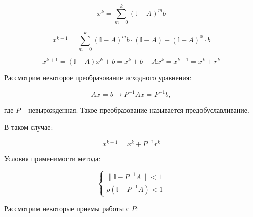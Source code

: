 \documentclass[10pt,a4paper]{article}
\begin{document}
		\begin{equation}
			x^{k} = \sum\limits_{m = 0}^{k}\left(\mathbb{I} - A\right)^{m}b	
		\end{equation}	
		
		\begin{equation}
			x^{k + 1} = \sum\limits_{m = 0}^{k}\left(\mathbb{I} - A\right)^{m}b	
			\cdot \left(\mathbb{I} - A\right) + \left(\mathbb{I} - A\right)^{0}
			\cdot b
		\end{equation}	
		
		\begin{equation}
			x^{k + 1} = \left(\mathbb{I} - A\right)x^{k} + b = 
			x^{k} + b - Ax^{k} = x^{k+1} = x^{k} + r^{k}	
		\end{equation}	
		
		Рассмотрим некоторое преобразование исходного уравнения:
		
		\begin{equation}
			Ax = b \rightarrow P^{-1}Ax = P^{-1}b, 	
		\end{equation}
		
		где $P$ -- невырожденная. Такое преобразование называется 
		предобуславливание.
		
		В таком случае:
		
		\begin{equation}
			x^{k + 1} = x^{k} + P^{-1}r^{k}
		\end{equation}
		
		Условия применимости метода:
		
		\begin{equation}
			\begin{cases}
				\parallel \mathbb{I} - P^{-1}A \parallel < 1
				\\
				\rho\left(\mathbb{I} - P^{-1}A \right) < 1
 			\end{cases}	
		\end{equation}	
		
		Рассмотрим некоторые приемы работы с $P$:
		
\end{document}
